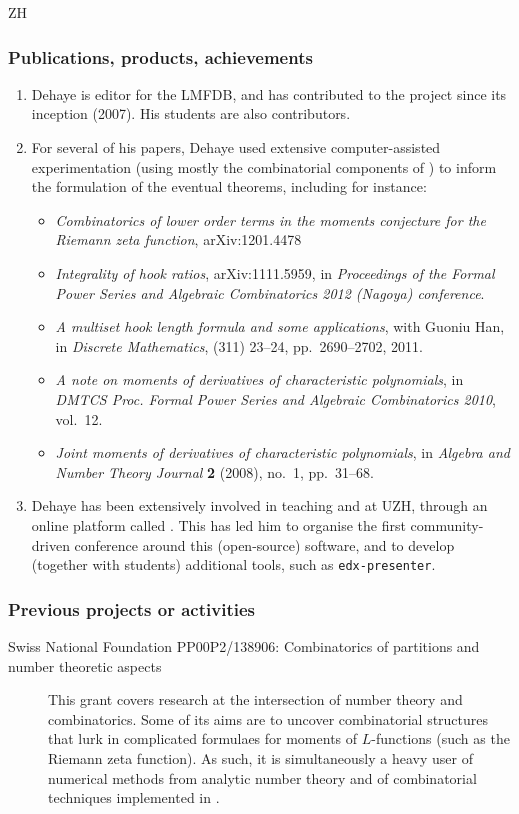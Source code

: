 \begin{sitedescription}{ZH}
\subsubsection*{Publications, products, achievements}
\begin{enumerate}
\item Dehaye is editor for the LMFDB, and has contributed to the project since its inception (2007). His students are also contributors. 
\item For several of his papers, Dehaye used extensive computer-assisted experimentation (using mostly the combinatorial components of \Sage) to inform the formulation of the eventual theorems, including for instance:
\begin{itemize}
\item \emph{Combinatorics of lower order terms in the moments conjecture for the Riemann zeta function}, \textsf{arXiv:1201.4478}
\item \emph{Integrality of hook ratios}, \textsf{arXiv:1111.5959}, in \emph{Proceedings of the Formal Power Series and Algebraic Combinatorics 2012 (Nagoya) conference}.
\item \emph{A multiset hook length formula and some applications}, with Guoniu Han, in \emph{Discrete Mathematics}, (311) 23--24, pp.~2690--2702, 2011.
\item \emph{A note on moments of derivatives of characteristic polynomials}, in \emph{DMTCS Proc. Formal Power Series and Algebraic Combinatorics 2010}, vol.~12.
\item \emph{Joint moments of derivatives of characteristic polynomials}, in \emph{Algebra and Number Theory Journal} {\bf 2} (2008), no.~1,  pp.~31--68.
\end{itemize}
\item Dehaye has been extensively involved in teaching \Python and \Sage at UZH, through an online platform called \OpenEdX. This has led him to organise the first community-driven conference around this (open-source) software, and to develop (together with students) additional tools, such as \texttt{edx-presenter}. 
\end{enumerate}

\subsubsection*{Previous projects or activities}
\begin{description}
\item[Swiss National Foundation PP00P2/138906: Combinatorics of partitions and number theoretic aspects] This grant covers research at the intersection of number theory and combinatorics. Some of its aims are to uncover combinatorial structures that lurk in complicated formulaes for moments of $L$-functions (such as the Riemann zeta function). As such, it is simultaneously a heavy user of numerical methods from analytic number theory and of combinatorial techniques implemented in \Sage.
\end{description}


\end{sitedescription}
